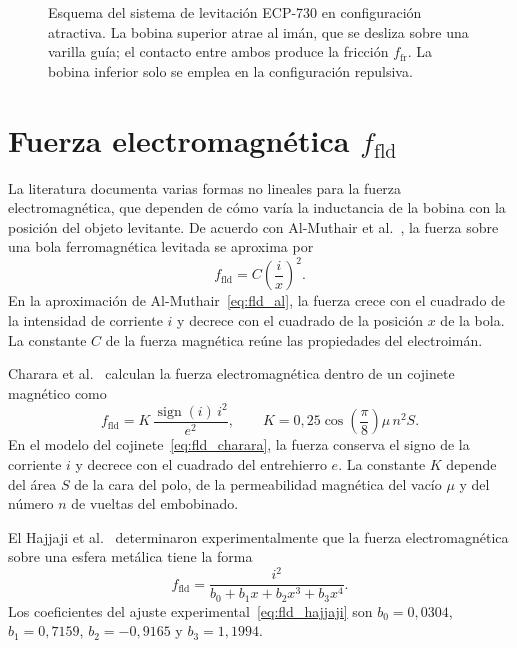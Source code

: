 \begin{figure}[ht]
    \centering
    
    \caption[Esquema del ECP-730 en configuración atractiva]{Esquema del sistema de levitación ECP-730 en configuración atractiva. La bobina superior atrae al imán, que se desliza sobre una varilla guía; el contacto entre ambos produce la fricción $f_{\text{fr}}$. La bobina inferior solo se emplea en la configuración repulsiva.}
    \label{fig:dispositivo}
\end{figure}

\section{\texorpdfstring{Fuerza electromagnética $f_{\text{fld}}$}{Fuerza electromagnética}}\label{sec:fuerza}

La literatura documenta varias formas no lineales para la fuerza electromagnética, que dependen de cómo varía la inductancia de la bobina con la posición del objeto levitante. De acuerdo con Al-Muthair et al.~\cite{al}, la fuerza sobre una bola ferromagnética levitada se aproxima por
\begin{equation}
f_{\text{fld}} = C\left(\dfrac{i}{x}\right)^2 .
\label{eq:fld_al}
\end{equation}
En la aproximación de Al-Muthair~\eqref{eq:fld_al}, la fuerza crece con el cuadrado de la intensidad de corriente $i$ y decrece con el cuadrado de la posición $x$ de la bola. La constante $C$ de la fuerza magnética reúne las propiedades del electroimán.

Charara et al.~\cite{charara} calculan la fuerza electromagnética dentro de un cojinete magnético como
\begin{equation}
f_{\text{fld}} = K\,\frac{\operatorname{sign}(i)\,i^{2}}{e^{2}},
\qquad
K = 0{,}25 \cos\!\left(\frac{\pi}{8}\right)\!\mu\, n^{2} S .
\label{eq:fld_charara}
\end{equation}
En el modelo del cojinete~\eqref{eq:fld_charara}, la fuerza conserva el signo de la corriente $i$ y decrece con el cuadrado del entrehierro $e$. La constante $K$ depende del área $S$ de la cara del polo, de la permeabilidad magnética del vacío $\mu$ y del número $n$ de vueltas del embobinado.

El Hajjaji et al.~\cite{el} determinaron experimentalmente que la fuerza electromagnética sobre una esfera metálica tiene la forma
\begin{equation}
f_{\text{fld}} = \dfrac{i^{2}}{b_0 + b_1x + b_2x^3 + b_3x^4} .
\label{eq:fld_hajjaji}
\end{equation}
Los coeficientes del ajuste experimental~\eqref{eq:fld_hajjaji} son $b_0=0{,}0304$, $b_1=0{,}7159$, $b_2=-0{,}9165$ y $b_3=1{,}1994$.

